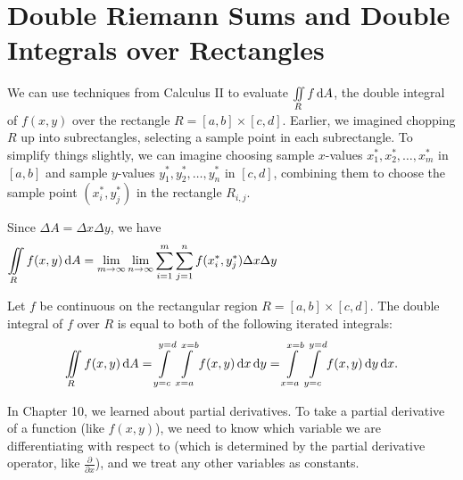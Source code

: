 \newlecture
\setcounter{chapter}{11}
\setcounter{section}{1}

\def\coursetopicnumber{III}
\def\topic{Double Riemann Sums and Double Integrals over Rectangles} %
\def\shorttopic{Iterated integrals} %
\def\textbookname{Active Calculus} %
\def\shorttextbookname{AC} %
\def\textbooksection{11.2} %
\def\textbooksectionurl{https://activecalculus.org/vector/S-11-2-Iterated-Integrals.html} %
\def\handoutday{} %


\thispagestyle{plain}
\topstuff
\section{\topic{} \booklink{}}
\label{sec:iterated-integration}
We can use techniques from Calculus II to evaluate $\iint\limits_R f\mathop{}\!\mathrm{d} A$, the double integral of $f(x,y)$ over the rectangle $R=[a,b]\times[c,d]$. Earlier, we imagined chopping $R$ up into subrectangles, selecting a sample point in each subrectangle. To simplify things slightly, we can imagine choosing sample $x$-values $x_1^*, x_2^*, \dots, x_m^*$ in $[a,b]$ and sample $y$-values $y_1^*, y_2^*, \dots, y_n^*$ in $[c,d]$, combining them to choose the sample point $(x_i^*,y_j^*)$ in the rectangle $R_{i,j}$.

Since $\Delta A=\Delta x \Delta y$, we have 
\[
    \iint\limits_R f(x,y)\mathop{}\!\mathrm{d} A = \lim\limits_{m\to\infty}\lim\limits_{n\to\infty}\sum\limits_{i=1}^m\sum\limits_{j=1}^nf(x_i^*,y_j^*)\Delta x\Delta y\hspace{2in}\mbox{}
\]

\vfill
\begin{thm}
    Let $f$ be continuous on the rectangular region $R=[a,b]\times[c,d]$. The double integral of $f$ over $R$ is equal to both of the following iterated integrals:
    \[
        \iint\limits_R f(x,y)\mathop{}\!\mathrm{d} A = \int\limits_{y=c}^{y=d}\, \int\limits_{x=a}^{x=b} f(x,y)\mathop{}\!\mathrm{d} x\mathop{}\!\mathrm{d} y = \int\limits_{x=a}^{x=b}\,\int\limits_{y=c}^{y=d} f(x,y)\mathop{}\!\mathrm{d} y\mathop{}\!\mathrm{d} x.
    \]
\end{thm}
\bigskip 

In Chapter 10, we learned about partial derivatives. To take a partial derivative of a function (like $f(x,y)$), we need to know which variable we are differentiating with respect to (which is determined by the partial derivative operator, like $\frac{\partial}{\partial x}$), and we treat any other variables as constants. 

